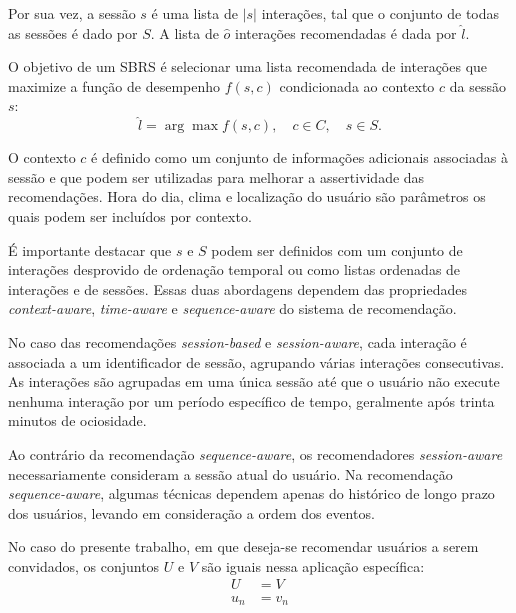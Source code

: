     Por sua vez, a sessão $s$ é uma lista de $|s|$ interações, tal que o
  conjunto de todas as sessões é dado por $S$. A lista de $\hat{o}$ interações
  recomendadas é dada por $\hat{l}$.

  O objetivo de um SBRS é selecionar uma lista recomendada de interações
  que maximize a função de desempenho $f(s, c)$ condicionada ao contexto $c$ da
  sessão $s$:
  \[\hat{l} = \arg \max f(s, c), \quad c \in C, \quad s \in S.\]   

 O contexto $c$ é definido como um conjunto de informações adicionais associadas
  à sessão e que podem ser utilizadas para melhorar a assertividade das
  recomendações.  Hora do dia, clima e localização do usuário são parâmetros os
  quais podem ser incluídos por contexto.

  É importante destacar que $s$ e $S$ podem
  ser definidos com um conjunto de interações desprovido de ordenação temporal
  ou como listas ordenadas de interações e de sessões. Essas duas abordagens
  dependem das propriedades \textit{context-aware}, \textit{time-aware}
  e \textit{sequence-aware} do sistema de recomendação.

  No caso das recomendações \textit{session-based} e \textit{session-aware},
  cada interação é associada a um identificador de sessão, agrupando várias
  interações consecutivas. As interações são agrupadas em uma única sessão até
  que o usuário não execute nenhuma interação por um período específico de
  tempo, geralmente após trinta minutos de ociosidade.
  
  Ao contrário da recomendação \textit{sequence-aware}, os recomendadores
  \textit{session-aware} necessariamente consideram a sessão atual do usuário.
  Na recomendação \textit{sequence-aware}, algumas técnicas dependem apenas do
  histórico de longo prazo dos usuários, levando em consideração a ordem dos
  eventos.

  No caso do presente trabalho, em que deseja-se
recomendar usuários a serem convidados, os conjuntos $U$ e $V$ são iguais nessa
aplicação específica:
\begin{equation*}
\begin{aligned}
  U & = V \\
  u_n & = v_n
\end{aligned}
\end{equation*}




